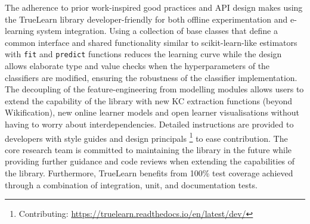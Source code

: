 \documentclass[letterpaper]{article} %
\begin{document}
The adherence to prior work-inspired good practices and API design makes using the TrueLearn library developer-friendly for both offline experimentation and e-learning system integration. Using a collection of base classes that define a common interface and shared functionality similar to scikit-learn-like estimators with \verb|fit| and \verb|predict| functions \cite{buitinck2013api} reduces the learning curve while the design allows elaborate type and value checks when the hyperparameters of the classifiers are modified, ensuring the robustness of the classifier implementation.
The decoupling of the feature-engineering from modelling modules allows users to extend the capability of the library with new KC extraction functions (beyond Wikification), new online learner models and open learner visualisations without having to worry about interdependencies. Detailed instructions are provided to developers with style guides and design principals \footnote{Contributing: \url{https://truelearn.readthedocs.io/en/latest/dev/}} to ease contribution. The core research team is committed to maintaining the library in the future while providing further guidance and code reviews when extending the capabilities of the library.
Furthermore, TrueLearn benefits from 100\% test coverage achieved through a combination of integration, unit, and documentation tests.
\end{document}
